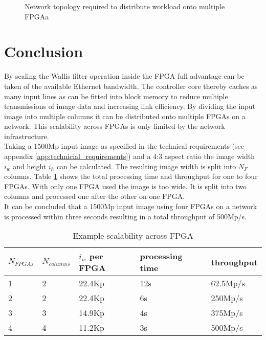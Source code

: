 \begin{figure}[h!]
    \centering
    \begin{adjustbox}{max height=5cm}
        
    \end{adjustbox}
    \caption{Network topology required to distribute workload onto multiple
    FPGAa}
    \label{fig:sca:network}
\end{figure}

\section{Conclusion}
By scaling the Wallis filter operation inside the FPGA full advantage can be
taken of the available Ethernet bandwidth. The controller core thereby caches as
many input lines as can be fitted into block memory to reduce multiple
transmissions of image data and increasing link efficiency. By dividing the input
image into multiple columns it can be distributed onto multiple FPGAs on a
network. This scalability across FPGAs is only limited by the network
infrastructure.
\\


Taking a 1500Mp input image as specified in the technical requirements (see
appendix \ref{app:technicial_requirements}) and a 4:3 aspect ratio the image
width $i_w$ and height $i_h$ can be calculated. The resulting image width is
split into $N_F$ columns. Table \ref{tab:sca:exacrfpga} shows the total
processing time and throughput for one to four FPGAs. With only one FPGA used
the image is too wide. It is split into two columns and processed one after the
other on one FPGA.
\\

It can be concluded that a 1500Mp input image using four FPGAs on a network is
processed within three seconds resulting in a total throughput of 500Mp/s.

\begin{table}[h!]
    \centering
    \begin{tabular}{l l l l l}
        \toprule
        $N_{FPGAs}$ & $N_{columns}$ & $i_w$ per FPGA &
        processing time & throughput \\
        \midrule
        1  & 2 &  22.4Kp & 12s & 62.5Mp/s \\
        2  & 2 &  22.4Kp & 6s  & 250Mp/s \\
        3  & 3 &  14.9Kp & 4s  & 375Mp/s \\
        4  & 4 &  11.2Kp & 3s  & 500Mp/s \\
        \bottomrule
    \end{tabular}
    \caption{Example scalability across FPGA}
    \label{tab:sca:exacrfpga}
\end{table}

